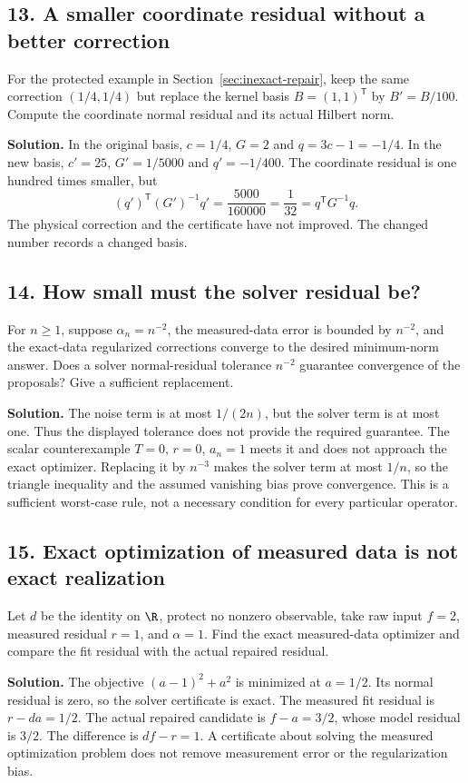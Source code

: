 \subsection*{13. A smaller coordinate residual without a better correction}
For the protected example in Section~\ref{sec:inexact-repair}, keep the same correction $(1/4,1/4)$ but replace the kernel basis $B=(1,1)^{\mathsf T}$ by $B'=B/100$. Compute the coordinate normal residual and its actual Hilbert norm.

\textbf{Solution.} In the original basis, $c=1/4$, $G=2$ and $q=3c-1=-1/4$. In the new basis, $c'=25$, $G'=1/5000$ and $q'=-1/400$. The coordinate residual is one hundred times smaller, but
\[
 (q')^{\mathsf T}(G')^{-1}q'=\frac{5000}{160000}=\frac1{32}
 =q^{\mathsf T}G^{-1}q.
\]
The physical correction and the certificate have not improved. The changed number records a changed basis.

\subsection*{14. How small must the solver residual be?}
For $n\ge1$, suppose $\alpha_n=n^{-2}$, the measured-data error is bounded by $n^{-2}$, and the exact-data regularized corrections converge to the desired minimum-norm answer. Does a solver normal-residual tolerance $n^{-2}$ guarantee convergence of the proposals? Give a sufficient replacement.

\textbf{Solution.} The noise term is at most $1/(2n)$, but the solver term is at most one. Thus the displayed tolerance does not provide the required guarantee. The scalar counterexample $T=0$, $r=0$, $a_n=1$ meets it and does not approach the exact optimizer. Replacing it by $n^{-3}$ makes the solver term at most $1/n$, so the triangle inequality and the assumed vanishing bias prove convergence. This is a sufficient worst-case rule, not a necessary condition for every particular operator.

\subsection*{15. Exact optimization of measured data is not exact realization}
Let $d$ be the identity on $\R$, protect no nonzero observable, take raw input $f=2$, measured residual $r=1$, and $\alpha=1$. Find the exact measured-data optimizer and compare the fit residual with the actual repaired residual.

\textbf{Solution.} The objective $(a-1)^2+a^2$ is minimized at $a=1/2$. Its normal residual is zero, so the solver certificate is exact. The measured fit residual is $r-da=1/2$. The actual repaired candidate is $f-a=3/2$, whose model residual is $3/2$. The difference is $df-r=1$. A certificate about solving the measured optimization problem does not remove measurement error or the regularization bias.

